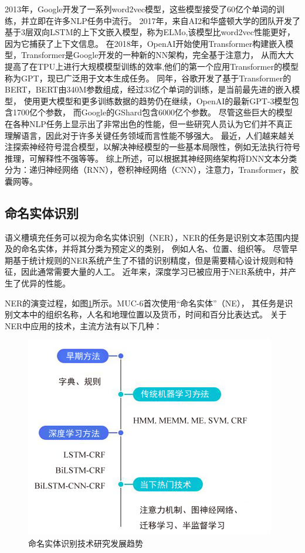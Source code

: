 2013年，Google开发了一系列word2vec模型\cite{mikolov2013distributed}，这些模型接受了60亿个单词的训练，并立即在许多NLP任务中流行。 
2017年，来自AI2和华盛顿大学的团队开发了基于3层双向LSTM的上下文嵌入模型，称为ELMo\cite{peters2018deep},该模型比word2vec性能更好，因为它捕获了上下文信息。
在2018年，OpenAI开始使用Transformer\cite{vaswani2017attention}构建嵌入模型，Transformer是Google开发的一种新的NN架构，完全基于注意力，
从而大大提高了在TPU上进行大规模模型训练的效率,他们的第一个应用Transformer的模型称为GPT\cite{radford2018improving}，现已广泛用于文本生成任务。
同年，谷歌开发了基于Transformer的BERT\cite{devlin2018bert}，BERT由340M参数组成，经过33亿个单词的训练，是当前最先进的嵌入模型，
使用更大模型和更多训练数据的趋势仍在继续，OpenAI的最新GPT-3模型\cite{brown2020language}包含1700亿个参数，
而Google的GShard\cite{lepikhin2020gshard}包含6000亿个参数。
尽管这些巨大的模型在各种NLP任务上显示出了非常出色的性能，但一些研究人员认为它们并不真正理解语言，因此对于许多关键任务领域而言性能不够强大。
最近，人们越来越关注探索神经符号混合模型，以解决神经模型的一些基本局限性，例如无法执行符号推理，可解释性不强等等。
综上所述，可以根据其神经网络架构将DNN文本分类分为：递归神经网络（RNN），卷积神经网络（CNN），注意力，Transformer，胶囊网等。


\subsection{命名实体识别}
语义槽填充任务可以视为命名实体识别（NER），NER的任务是识别文本范围内提及的命名实体，并将其分类为预定义的类别，
例如人名、位置、组织等。
尽管早期基于统计规则的NER系统产生了不错的识别精度，但是需要精心设计规则和特征，因此通常需要大量的人工。
近年来，深度学习已被应用于NER系统中，并产生了优异的性能。

NER的演变过程，如图\ref{fig:nerp}所示。MUC-6首次使用“命名实体”（NE），
其任务是识别文本中的组织名称，人名和地理位置以及货币，时间和百分比表达式。
关于NER中应用的技术，主流方法有以下几种：

\begin{figure}[htbp]
  \centering
  \includegraphics[scale=1]{./images/nerp.jpg}
  \caption{命名实体识别技术研究发展趋势\cite{nadeau2007survey}}
  \label{fig:nerp}
\end{figure}

